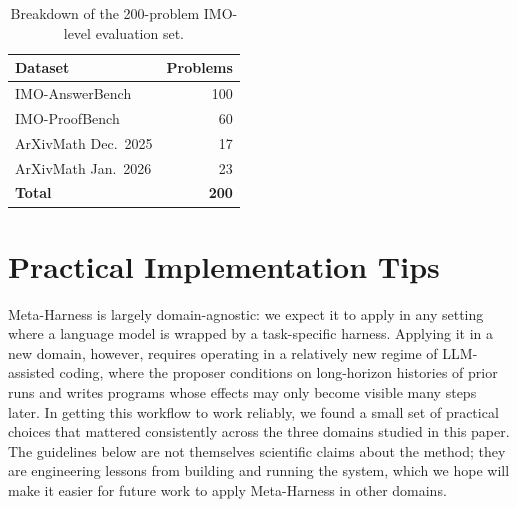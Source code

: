 \begin{table}[h]
\centering
\begin{tabular}{lr}
\toprule
\textbf{Dataset} & \textbf{Problems} \\
\midrule
IMO-AnswerBench & 100 \\
IMO-ProofBench & 60 \\
ArXivMath Dec.\ 2025 & 17 \\
ArXivMath Jan.\ 2026 & 23 \\
\midrule
\textbf{Total} & \textbf{200} \\
\bottomrule
\end{tabular}
\caption{
    Breakdown of the 200-problem IMO-level evaluation set.}
\label{tab:math_eval_breakdown}
\end{table}

\section{Practical Implementation Tips}
\label{app:practical-tips}

Meta-Harness is largely domain-agnostic: we expect it to apply in any setting where a language model is wrapped by a task-specific harness.
Applying it in a new domain, however, requires operating in a relatively new regime of LLM-assisted coding, where the proposer conditions on long-horizon histories of prior runs and writes programs whose effects may only become visible many steps later.
In getting this workflow to work reliably, we found a small set of practical choices that mattered consistently across the three domains studied in this paper.
The guidelines below are not themselves scientific claims about the method; they are engineering lessons from building and running the system, which we hope will make it easier for future work to apply Meta-Harness in other domains.


